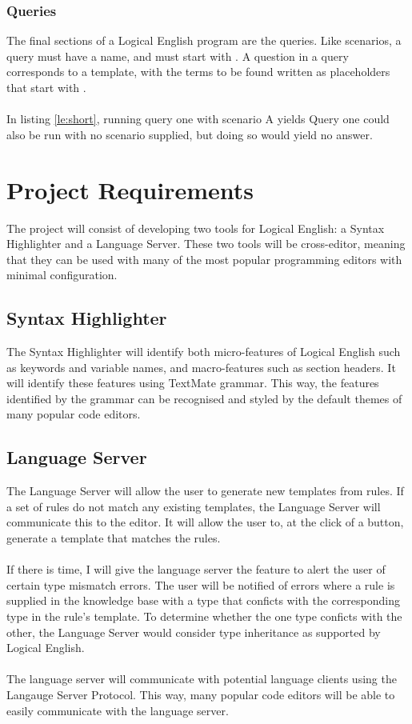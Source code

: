 \documentclass[../main.tex]{subfiles}
\begin{document}
\subsubsection{Queries}
The final sections of a Logical English program are the queries. Like scenarios, a query must have a name, and must start with . A question in a query corresponds to a template, with the terms to be found written as placeholders that start with . 
\\ \\ 
In listing \ref{le:short}, running query one with scenario A yields
 Query one could also be run with no scenario supplied, but doing so would yield no answer.

\newpage
\section{Project Requirements}
The project will consist of developing two tools for Logical English: a Syntax Highlighter and a Language Server. These two tools will be cross-editor, meaning that they can be used with many of the most popular programming editors with minimal configuration.

\subsection{Syntax Highlighter}
The Syntax Highlighter will identify both micro-features of Logical English such as keywords and variable names, and macro-features such as section headers. It will identify these features using TextMate grammar. This way, the features identified by the grammar can be recognised and styled by the default themes of many popular code editors. 

\subsection{Language Server}
The Language Server will allow the user to generate new templates from rules. If a set of rules do not match any existing templates, the Language Server will communicate this to the editor. It will allow the user to, at the click of a button, generate a template that matches the rules. 
\\ \\ 
If there is time, I will give the language server the feature to alert the user of certain type mismatch errors. The user will be notified of errors where a rule is supplied in the knowledge base with a type that conficts with the corresponding type in the rule's template. To determine whether the one type conficts with the other, the Language Server would consider type inheritance as supported by Logical English.
\\ \\
The language server will communicate with potential language clients using the Langauge Server Protocol. This way, many popular code editors will be able to easily communicate with the language server.
\end{document}
